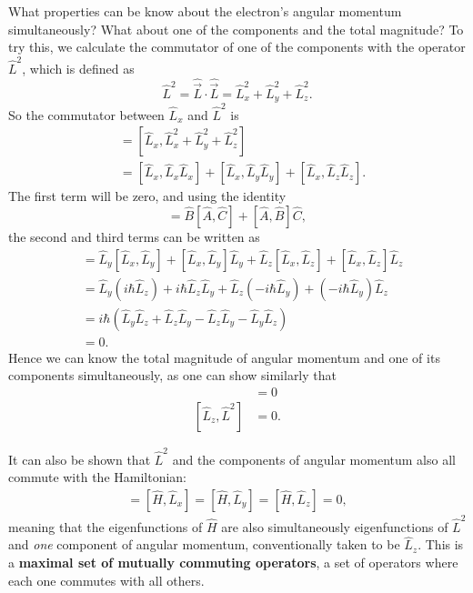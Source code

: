 \documentclass[../quantum_mechanics.tex]{subfiles}
\begin{document}
            What properties can be know about the electron's angular momentum simultaneously?
            What about one of the components and the total magnitude?
            To try this, we calculate the commutator of one of the components with the operator $\hat{L}^2$, which is defined as
            \begin{equation}
                \hat{L}^2=\hat{\vec{L}}\cdot\hat{\vec{L}}=\hat{L}_x^2+\hat{L}_y^2+\hat{L}_z^2.
            \end{equation}
            So the commutator between $\hat{L}_x$ and $\hat{L}^2$ is
            \begin{align}
                [\hat{L}_x,\hat{L}^2]&=[\hat{L}_x,\hat{L}_x^2+\hat{L}_y^2+\hat{L}_z^2]\\
                &=[\hat{L}_x,\hat{L}_x\hat{L}_x]+[\hat{L}_x,\hat{L}_y\hat{L}_y]+[\hat{L}_x,\hat{L}_z\hat{L}_z].
            \end{align}
            The first term will be zero, and using the identity
            \begin{equation}
                [\hat{A},\hat{B}\hat{C}]=\hat{B}[\hat{A},\hat{C}]+[\hat{A},\hat{B}]\hat{C},
            \end{equation}
            the second and third terms can be written as
            \begin{align}
                [\hat{L}_x,\hat{L}^2]&=\hat{L}_y[\hat{L}_x,\hat{L}_y]+[\hat{L}_x,\hat{L}_y]\hat{L}_y+\hat{L}_z[\hat{L}_x,\hat{L}_z]+[\hat{L}_x,\hat{L}_z]\hat{L}_z\\
                &=\hat{L}_y(i\hbar\hat{L}_z)+i\hbar\hat{L}_z\hat{L}_y+\hat{L}_z(-i\hbar\hat{L}_y)+(-i\hbar\hat{L}_y)\hat{L}_z\\
                &=i\hbar(\hat{L}_y\hat{L}_z+\hat{L}_z\hat{L}_y-\hat{L}_z\hat{L}_y-\hat{L}_y\hat{L}_z)\\
                &=0.
            \end{align}
            Hence we can know the total magnitude of angular momentum and one of its components simultaneously, as one can show similarly that
            \begin{align}
                [\hat{L}_y,\hat{L}^2]&=0\\
                [\hat{L}_z,\hat{L}^2]&=0.
            \end{align}

            It can also be shown that $\hat{L}^2$ and the components of angular momentum also all commute with the Hamiltonian:
            \begin{align}
                [\hat{H},\hat{L}^2]=[\hat{H},\hat{L}_x]=[\hat{H},\hat{L}_y]=[\hat{H},\hat{L}_z]=0,
            \end{align}
            meaning that the eigenfunctions of $\hat{H}$ are also simultaneously eigenfunctions of $\hat{L}^2$ and \textit{one} component of angular momentum, conventionally taken to be $\hat{L}_z$.
            This is a \textbf{maximal set of mutually commuting operators}, a set of operators where each one commutes with all others.
\end{document}
